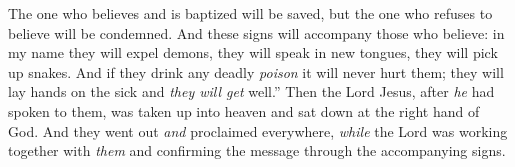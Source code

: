 \begin{biblechapter}
{\verse The one who believes and is baptized will be saved, but the one who refuses to believe will be condemned.
\verse And these signs will accompany those who believe: in my name they will expel demons, they will speak in new tongues,
\verse they will pick up snakes. And if they drink any deadly \textit{poison} it will never hurt them; they will lay hands on the sick and \textit{they will get} well.”
\verse Then the Lord Jesus, after \textit{he} had spoken to them, was taken up into heaven and sat down at the right hand of God.
\verse And they went out \textit{and} proclaimed everywhere, \textit{while} the Lord was working together with \textit{them} and confirming the message through the accompanying signs.}
\end{biblechapter}

